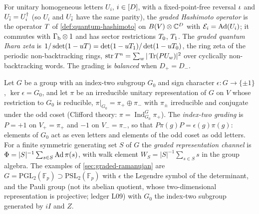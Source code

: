 \begin{definition}
\label{def:graded-hashimoto}
For unitary homogeneous letters $U_i$, $i\in[D]$, with a fixed-point-free reversal $\iota$ and
$U_{\bar{i}} = U_i^\dagger$ (so $U_i$ and $U_{\bar{i}}$ have the same parity), the \emph{graded
Hashimoto operator} is the operator $T$ of \cref{def:quantum-hashimoto} on $B(V)\otimes
\mathbb C^{D}$ with $\mathcal E_{i} = \operatorname{Ad}(U_i)$; it commutes with $\Gamma_{\mathrm b}\otimes1$ and has sector
restrictions $T_0$, $T_1$. The \emph{graded quantum Ihara zeta} is $1/\operatorname{sdet}(1-uT) =
\det(1-uT_1)/\det(1-uT_0)$, the ring zeta of the periodic non-backtracking rings,
$\operatorname{str}T^n = \sum_w|\operatorname{Tr}(PU_w)|^2$ over cyclically non-backtracking words. The grading is
\emph{balanced} when $D_+ = D_-$.
\end{definition}

\begin{definition}
\label{def:index-two-grading}
Let $G$ be a group with an index-two subgroup $G_0$ and sign character $\epsilon\colon G\to\{\pm1\}$,
$\ker\epsilon = G_0$, and let $\pi$ be an irreducible unitary representation of $G$ on $V$ whose
restriction to $G_0$ is reducible, $\pi|_{G_0} = \pi_+\oplus\pi_-$ with $\pi_\pm$ irreducible and
conjugate under the odd coset (Clifford theory: $\pi = \operatorname{Ind}_{G_0}^G\pi_+$). The
\emph{index-two grading} is $P = +1$ on $V_+ = \pi_+$ and $-1$ on $V_- = \pi_-$, so that $P\pi(g)P
= \epsilon(g)\pi(g)$: elements of $G_0$ act as even letters and elements of the odd coset as odd
letters. For a finite symmetric generating set $S$ of $G$ the \emph{graded representation channel}
is $\Phi = |S|^{-1}\sum_{s\in S}\operatorname{Ad}\pi(s)$, with walk element $W_S = |S|^{-1}\sum_{s\in S}s$ in the
group algebra. The examples of \cref{sec:graded-ramanujan} are $G = \mathrm{PGL}_2(\mathbb F_p)
\supset\mathrm{PSL}_2(\mathbb F_p)$ with $\epsilon$ the Legendre symbol of the determinant, and
the Pauli group (not its abelian quotient, whose two-dimensional representation is projective;
ledger L09) with $G_0$ the index-two subgroup generated by $iI$ and $Z$.
\end{definition}

